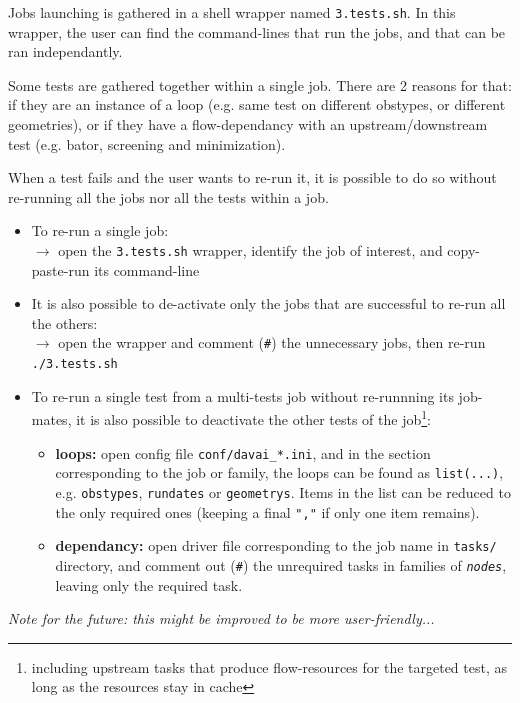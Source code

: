 \documentclass[a4paper,10pt,twoside]{article}
\begin{document}
Jobs launching is gathered in a shell wrapper named \texttt{3.tests.sh}.
In this wrapper, the user can find the command-lines that run the jobs, and that can be ran independantly.

Some tests are gathered together within a single job. There are 2 reasons for that: if they are an instance of a loop (e.g. same test on different obstypes, or different geometries), or if they have a flow-dependancy with an upstream/downstream test (e.g. bator, screening and minimization).

When a test fails and the user wants to re-run it, it is possible to do so without re-running all the jobs nor all the tests within a job.

\begin{itemize}
 \item To re-run a single job:\\
       $\rightarrow$ open the \texttt{3.tests.sh} wrapper, identify the job of interest, and copy-paste-run its command-line
 \item It is also possible to de-activate only the jobs that are successful to re-run all the others:\\
       $\rightarrow$ open the wrapper and comment (\texttt{\#}) the unnecessary jobs, then re-run \texttt{./3.tests.sh}
 \item To re-run a single test from a multi-tests job without re-runnning its job-mates, it is also possible to deactivate the other tests of the job\footnote{including upstream tasks that produce flow-resources for the targeted test, as long as the resources stay in cache}:
       \begin{itemize}[label=$\rightarrow$]
        \item \textbf{loops:} open config file \texttt{conf/davai\_*.ini}, and in the section corresponding to the job or family, the loops can be found as \texttt{list(...)}, e.g. \texttt{obstypes}, \texttt{rundates} or \texttt{geometrys}. Items in the list can be reduced to the only required ones (keeping a final \texttt{","} if only one item remains).
        \item \textbf{dependancy:} open driver file corresponding to the job name in \texttt{tasks/} directory, and comment out (\texttt{\#}) the unrequired tasks in families of \textit{\texttt{nodes}}, leaving only the required task.
       \end{itemize}
\end{itemize}

\textit{Note for the future: this might be improved to be more user-friendly...}
\end{document}
